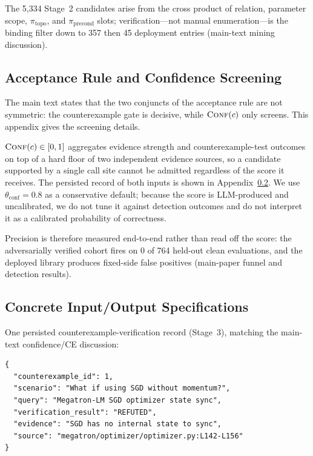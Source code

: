\documentclass[sigconf,nonacm]{acmart}
\begin{document}
The 5{,}334 Stage~2 candidates arise from the cross product of relation, parameter scope, $\pi_{\text{topo}}$, and $\pi_{\text{precond}}$ slots; verification---not manual enumeration---is the binding filter down to 357 then 45 deployment entries (main-text mining discussion).


\subsection{Acceptance Rule and Confidence Screening}
\label{app:conf-screening}

The main text states that the two conjuncts of the acceptance rule are not
symmetric: the counterexample gate is decisive, while $\textsc{Conf}(c)$ only
screens. This appendix gives the screening details.

$\textsc{Conf}(c) \in [0,1]$ aggregates evidence strength and
counterexample-test outcomes on top of a hard floor of two independent
evidence sources, so a candidate supported by a single call site cannot be
admitted regardless of the score it receives. The persisted record of both
inputs is shown in Appendix~\ref{app:io_examples}. We use
$\theta_{\text{conf}}{=}0.8$ as a conservative default; because the score is
LLM-produced and uncalibrated, we do not tune it against detection outcomes
and do not interpret it as a calibrated probability of correctness.

Precision is therefore measured end-to-end rather than read off the score:
the adversarially verified cohort fires on 0 of 764 held-out clean
evaluations, and the deployed library produces \FixedFPFrac{} fixed-side
false positives (main-paper funnel and detection results).

\subsection{Concrete Input/Output Specifications}
\label{app:io_examples}

One persisted counterexample-verification record (Stage~3), matching the
main-text confidence/CE discussion:

\begin{verbatim}
{
  "counterexample_id": 1,
  "scenario": "What if using SGD without momentum?",
  "query": "Megatron-LM SGD optimizer state sync",
  "verification_result": "REFUTED",
  "evidence": "SGD has no internal state to sync",
  "source": "megatron/optimizer/optimizer.py:L142-L156"
}
\end{verbatim}
\end{document}
